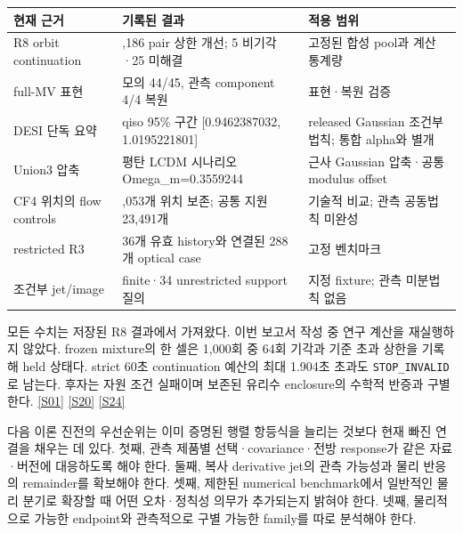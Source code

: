 \documentclass[11pt,a4paper]{article}
\begin{document}
{\small\setlength{\tabcolsep}{4pt}\renewcommand{\arraystretch}{1.3}

\begin{longtable}{>{\raggedright\arraybackslash}p{0.2300\dimexpr\linewidth-24pt\relax}>{\raggedright\arraybackslash}p{0.2900\dimexpr\linewidth-24pt\relax}>{\raggedright\arraybackslash}p{0.4800\dimexpr\linewidth-24pt\relax}}\toprule

현재 근거 & 기록된 결과 & 적용 범위 \\

\midrule\endhead

R8 orbit continuation & 7,186 pair 상한 개선; 5 비기각·25 미해결 & 고정된 합성 pool과 계산 통계량 \\

full-MV 표현 & 모의 44/45, 관측 component 4/4 복원 & 표현·복원 검증 \\

DESI 단독 요약 & qiso 95\% 구간 [0.9462387032, 1.0195221801] & released Gaussian 조건부 법칙; 통합 alpha와 별개 \\

Union3 압축 & 평탄 LCDM 시나리오 Omega\_m=0.3559244 & 근사 Gaussian 압축·공통 modulus offset \\

CF4 위치의 flow controls & 38,053개 위치 보존; 공통 지원 23,491개 & 기술적 비교; 관측 공동법칙 미완성 \\

restricted R3 & 36개 유효 history와 연결된 288개 optical case & 고정 벤치마크 \\

조건부 jet/image & 204 finite·34 unrestricted support 질의 & 지정 fixture; 관측 미분법칙 없음 \\

\bottomrule\end{longtable}}

모든 수치는 저장된 R8 결과에서 가져왔다. 이번 보고서 작성 중 연구 계산을 재실행하지 않았다. frozen mixture의 한 셀은 1,000회 중 64회 기각과 기준 초과 상한을 기록해 held 상태다. strict 60초 continuation 예산의 최대 1.904초 초과도 \texttt{STOP\_INVALID}로 남는다. 후자는 자원 조건 실패이며 보존된 유리수 enclosure의 수학적 반증과 구별한다. \hyperlink{src:S01}{[S01]} \hyperlink{src:S20}{[S20]} \hyperlink{src:S24}{[S24]}


다음 이론 진전의 우선순위는 이미 증명된 행렬 항등식을 늘리는 것보다 현재 빠진 연결을 채우는 데 있다. 첫째, 관측 제품별 선택·covariance·전방 response가 같은 자료·버전에 대응하도록 해야 한다. 둘째, 복사 derivative jet의 관측 가능성과 물리 반응의 remainder를 확보해야 한다. 셋째, 제한된 numerical benchmark에서 일반적인 물리 분기로 확장할 때 어떤 오차·정칙성 의무가 추가되는지 밝혀야 한다. 넷째, 물리적으로 가능한 endpoint와 관측적으로 구별 가능한 family를 따로 분석해야 한다.
\end{document}
